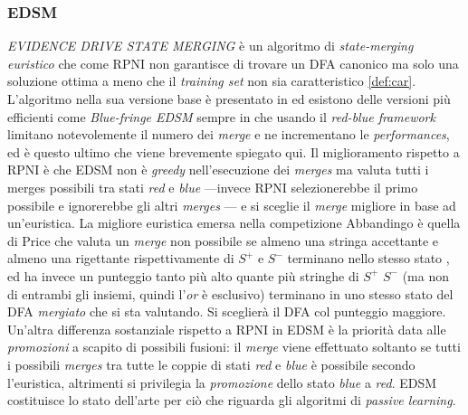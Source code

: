 \subsubsection{EDSM}
\textit{EVIDENCE DRIVE STATE MERGING}  è un algoritmo di \textit{state-merging} \textit{euristico} che come RPNI non garantisce di trovare un \ac{DFA} canonico ma solo una soluzione ottima a meno che il \textit{training set} non sia caratteristico \ref{def:car}. L'algoritmo nella sua versione base è presentato in \cite{Abbadingo98} ed esistono delle versioni più efficienti come \textit{Blue-fringe EDSM} sempre in \cite{Abbadingo98} che usando il \textit{red-blue framework} limitano notevolemente il numero dei \textit{merge} e ne incrementano le \textit{performances}, ed è questo ultimo che viene brevemente spiegato qui.
Il miglioramento rispetto a RPNI è che EDSM non è \textit{greedy} nell'esecuzione dei \textit{merges} ma valuta tutti i merges possibili tra stati \textit{red} e \textit{blue} ---invece RPNI selezionerebbe il primo possibile e ignorerebbe gli altri \textit{merges} --- e si sceglie il \textit{merge} migliore in base ad un'euristica. La migliore euristica emersa nella competizione Abbandingo è quella di Price che valuta un \textit{merge} non possibile se almeno una stringa accettante e almeno una rigettante rispettivamente di $S^{+} \text{ e } S^{-}$ terminano nello stesso stato , ed ha invece un punteggio tanto più alto quante più stringhe di $S^{+}$  $S^{-}$ (ma non di entrambi gli insiemi, quindi l'\textit{or} è esclusivo)  terminano in uno stesso stato del \ac{DFA} \textit{mergiato} che si sta valutando. Si sceglierà il \ac{DFA} col punteggio maggiore.\\
Un'altra differenza sostanziale rispetto a RPNI in EDSM è la priorità data alle \textit{promozioni} a scapito di possibili fusioni: il \textit{merge} viene effettuato soltanto se tutti i possibili \textit{merges} tra tutte le coppie di stati \textit{red} e \textit{blue} è possibile secondo l'euristica, altrimenti si privilegia la \textit{promozione} dello stato \textit{blue} a \textit{red}. 
EDSM costituisce lo stato dell'arte per ciò che riguarda gli algoritmi di \textit{passive learning}.